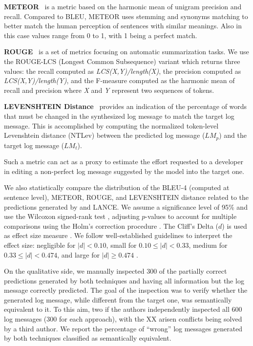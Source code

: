 \textbf{METEOR}~\cite{meteor} is a metric based on the harmonic mean of unigram precision and recall. Compared to BLEU, METEOR uses stemming and synonyms matching to better match the human perception of sentences with similar meanings. Also in this case values range from 0 to 1, with 1 being a perfect match.

\textbf{ROUGE}~\cite{lin2004rouge} is a set of metrics focusing on automatic summarization tasks. We use the ROUGE-LCS (Longest Common Subsequence) variant which returns three values: the recall computed as \textit{LCS(X,Y)/length(X)}, the precision computed as \textit{LCS(X,Y)/length(Y)}, and the F-measure computed as the harmonic mean of recall and precision where \textit{X} and \textit{Y} represent two sequences of tokens.

\textbf{LEVENSHTEIN Distance}~\cite{levenshtein1966} provides an indication of the percentage of words that must be changed in the synthesized log message to match the target log message. This is accomplished by computing the normalized token-level Levenshtein distance \cite{levenshtein1966} (NTLev) between the predicted log message ($LM_p$) and the target log message ($LM_t$).

%

Such a metric can act as a proxy to estimate the effort requested to a developer in editing a non-perfect log message suggested by the model into the target one.

We also statistically compare the distribution of the BLEU-4 (computed at sentence level), METEOR, ROUGE, and LEVENSHTEIN distance related to the predictions generated by \approach and LANCE. We assume a significance level of 95\% and use the Wilcoxon signed-rank test \cite{wilcoxon}, adjusting $p$-values to account for multiple comparisons using the Holm's correction procedure \cite{Holm1979a}. The  Cliff's Delta ($d$) is used as effect size measure \cite{Gris2005a}. We follow well-established guidelines to interpret the effect size: negligible for $|d| < 0.10$, small for $0.10 \le |d| < 0.33$, medium for $0.33 \le |d| < 0.474$, and large for $|d| \ge 0.474$ \cite{Gris2005a}.

On the qualitative side, we manually inspected 300 of the partially correct predictions generated by both techniques and having all information but the log message correctly predicted. The goal of the inspection was to verify whether the generated log message, while different from the target one, was semantically equivalent to it. To this aim, two if the authors independently inspected all 600 log messages (300 for each approach), with the XX arisen conflicts being solved by a third author. We report the percentage of ``wrong'' log messages generated by both techniques classified as semantically equivalent.

